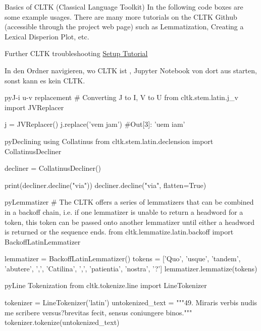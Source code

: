 \documentclass[10pt,a4paper]{article}
\begin{document}
\begin{multicols}{3}
\begin{textbox}{Basics of CLTK (Classical Language Toolkit)}
In the following code boxes are some example usages.
There are many more tutorials on the CLTK Github (accessible through the project web page) such as Lemmatization, Creating a Lexical Disperion Plot, etc.
\end{textbox}

\begin{textbox}{Further CLTK troubleshooting}
\href{https://github.com/cltk/tutorials/blob/master/1%20CLTK%20Setup.ipynb}{Setup Tutorial}

In den Ordner navigieren, wo CLTK ist \sep 
Jupyter Notebook von dort aus  starten, sonst kann es kein CLTK.
\end{textbox}

\begin{codebox}{py}{J-i u-v replacement}
# Converting J to I, V to U
from cltk.stem.latin.j_v import JVReplacer

j = JVReplacer()
j.replace('vem jam') #Out[3]: 'uem iam'
\end{codebox}

\begin{codebox}{py}{Declining using Collatinus}
from cltk.stem.latin.declension import CollatinusDecliner

decliner = CollatinusDecliner()

print(decliner.decline("via"))
decliner.decline("via", flatten=True)
\end{codebox}

\begin{codebox}{py}{Lemmatizer}
# The CLTK offers a series of lemmatizers that can be combined in a backoff chain, i.e. if one lemmatizer is unable to return a headword for a token, this token can be passed onto another lemmatizer until either a headword is returned or the sequence ends.
from cltk.lemmatize.latin.backoff import BackoffLatinLemmatizer

lemmatizer = BackoffLatinLemmatizer()
tokens = ['Quo', 'usque', 'tandem', 'abutere', ',', 'Catilina', ',', 'patientia', 'nostra', '?']
lemmatizer.lemmatize(tokens)
\end{codebox}

\begin{codebox}{py}{Line Tokenization}
from cltk.tokenize.line import LineTokenizer

tokenizer = LineTokenizer('latin')
untokenized_text = """49. Miraris verbis nudis me scribere versus?\nHoc brevitas fecit, sensus coniungere binos."""
tokenizer.tokenize(untokenized_text)
\end{codebox}


\end{multicols}
\end{document}
